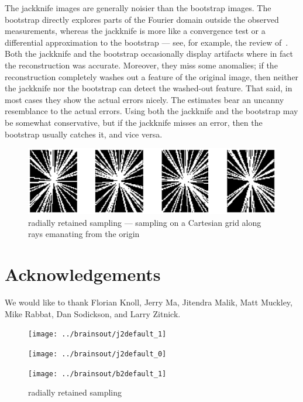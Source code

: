 \documentclass{article}
\begin{document}
The jackknife images are generally noisier than the bootstrap images.
The bootstrap directly explores parts of the Fourier domain
outside the observed measurements, whereas the jackknife is more
like a convergence test or a differential approximation to the bootstrap ---
see, for example, the review of~\cite{efron-tibshirani}.
Both the jackknife and the bootstrap occasionally display artifacts
where in fact the reconstruction was accurate.
Moreover, they miss some anomalies;
if the reconstruction completely washes out a feature of the original image,
then neither the jackknife nor the bootstrap can detect the washed-out feature.
That said, in most cases they show the actual errors nicely.
The estimates bear an uncanny resemblance to the actual errors.
Using both the jackknife and the bootstrap may be somewhat conservative,
but if the jackknife misses an error, then the bootstrap usually catches it,
and vice versa.


\begin{figure}
\parbox{\textwidth}{\includegraphics[width=\textwidth]{mask}}
\caption{radially retained sampling ---
         sampling on a Cartesian grid along rays emanating from the origin}
\label{radialines}
\end{figure}


\section*{Acknowledgements}

We would like to thank Florian Knoll, Jerry Ma, Jitendra Malik, Matt Muckley,
Mike Rabbat, Dan Sodickson, and Larry Zitnick.


\begin{figure}
\begin{centering}

\parbox{.65\textwidth}{\texttt{[image: ../brainsout/j2default\_1]}}

\vspace{.25in}

\parbox{.65\textwidth}{\texttt{[image: ../brainsout/j2default\_0]}}

\vspace{.25in}

\parbox{.65\textwidth}{\texttt{[image: ../brainsout/b2default\_1]}}

\end{centering}
\caption{radially retained sampling}
\label{bigradial}
\end{figure}
\end{document}
